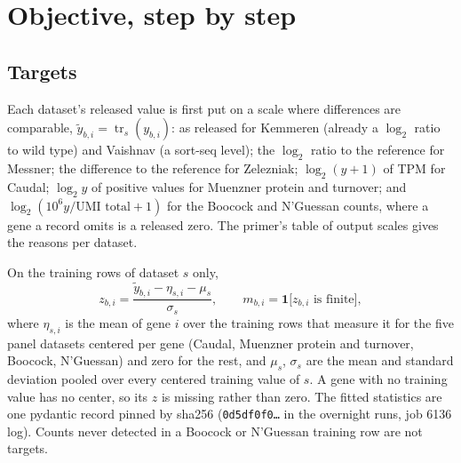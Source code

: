 
\section{Objective, step by step}
\label{sec:objective}

\subsection{Targets}
\label{sec:targets}

Each dataset's released value is first put on a scale where differences are comparable,
$\tilde y_{b,i} = \operatorname{tr}_s(y_{b,i})$: as released for Kemmeren (already a
$\log_2$ ratio to wild type) and Vaishnav (a sort-seq level); the $\log_2$ ratio to the
reference for Messner; the difference to the reference for Zelezniak; $\log_2(y+1)$ of TPM
for Caudal; $\log_2 y$ of positive values for Muenzner protein and turnover; and
$\log_2(10^{6} y / \text{UMI total} + 1)$ for the Boocock and N'Guessan counts, where a
gene a record omits is a released zero. The primer's table of output scales gives the
reasons per dataset.

On the training rows of dataset $s$ only,
\begin{equation}
z_{b,i} = \frac{\tilde y_{b,i} - \eta_{s,i} - \mu_s}{\sigma_s},
\qquad
m_{b,i} = \mathbf{1}\big[z_{b,i} \text{ is finite}\big],
\label{eq:standardize}
\end{equation}
where $\eta_{s,i}$ is the mean of gene $i$ over the training rows that measure it for the
five panel datasets centered per gene (Caudal, Muenzner protein and turnover, Boocock,
N'Guessan) and zero for the rest, and $\mu_s$, $\sigma_s$ are the mean and standard
deviation pooled over every centered training value of $s$. A gene with no training value
has no center, so its $z$ is missing rather than zero. The fitted statistics are one
pydantic record pinned by sha256 (\texttt{0d5df0f0\ldots} in the overnight runs, job 6136
log). Counts never detected in a Boocock or N'Guessan training row are not targets.

